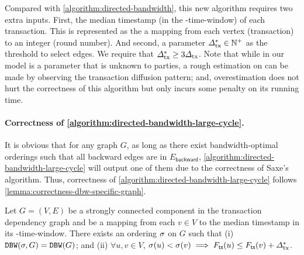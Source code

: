 Compared with \cref{algorithm:directed-bandwidth}, this new algorithm
requires two extra inputs.
%
First, the median timestamp (in the \PBWindowLen-time-window) of each
transaction.
%
This is represented as the a mapping \mapTimestamp from each vertex (transaction) to an
integer (round number).
%
And second, a parameter $\varDelta_{\mathrm{tx}}^* \in \mathbb{N}^+$ as the threshold to select
edges.
%
We require that $\varDelta_{\mathrm{tx}}^* \ge 3\varDelta_{\mathrm{tx}}$.
%
Note that while in our model \txDelay is a parameter that is unknown to parties,
a rough estimation on \txDelay can be made by observing the transaction
diffusion pattern; and, overestimation does not hurt the correctness of this
algorithm but only incurs some penalty on its running time.



\paragraph{Correctness of \cref*{algorithm:directed-bandwidth-large-cycle}.}
%
It is obvious that for any graph $G$, as long as there exist bandwidth-optimal
orderings such that all backward edges are in $E_{\mathsf{backward}}$,
\cref{algorithm:directed-bandwidth-large-cycle} will output one of them
due to the correctness of Saxe's algorithm.
%
Thus, correctness of \cref{algorithm:directed-bandwidth-large-cycle} follows
\cref{lemma:correctness-dbw-specific-graph}.

\begin{lemma} \label{lemma:correctness-dbw-specific-graph}
    Let $G = (V, E)$ be a strongly connected component in the transaction dependency graph and \mapTimestamp be a mapping from each $v \in V$ to the median timestamp in its \PBWindowLen-time-window.
    There exists an ordering $\sigma$ on $G$ such that (i) $\mathtt{DBW}(\sigma, G) = \mathtt{DBW}(G)$; and (ii) $\forall u, v \in V$, $\sigma(u) < \sigma(v) \implies F_{\mathsf{ts}}(u) \le F_{\mathsf{ts}}(v) + \varDelta_{\mathrm{tx}}^*$.
\end{lemma}

